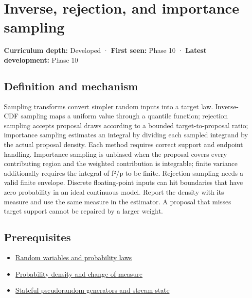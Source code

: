 \hypertarget{appendix-8d863ed954d0}{}\label{referencestart:appendix-8d863ed954d0}
\section{Inverse, rejection, and importance sampling}\label{appendix-8d863ed954d0-inverse-rejection-and-importance-sampling}

\textbf{Curriculum depth:} Developed · \textbf{First seen:} Phase 10 · \textbf{Latest development:} Phase 10

\subsection{Definition and mechanism}\label{appendix-8d863ed954d0-definition-and-mechanism}

Sampling transforms convert simpler random inputs into a target law. Inverse-CDF sampling maps a uniform value through a quantile function; rejection sampling accepts proposal draws according to a bounded target-to-proposal ratio; importance sampling estimates an integral by dividing each sampled integrand by the actual proposal density. Each method requires correct support and endpoint handling. Importance sampling is unbiased when the proposal covers every contributing region and the weighted contribution is integrable; finite variance additionally requires the integral of f²/p to be finite. Rejection sampling needs a valid finite envelope. Discrete floating-point inputs can hit boundaries that have zero probability in an ideal continuous model. Report the density with its measure and use the same measure in the estimator. A proposal that misses target support cannot be repaired by a larger weight.

\subsection{Prerequisites}\label{appendix-8d863ed954d0-prerequisites}

\begin{itemize}
\tightlist
\item
  \hyperref[appendix-4d0203f7944f]{Random variables and probability laws}
\item
  \hyperref[appendix-4815cd87ab8b]{Probability density and change of measure}
\item
  \hyperref[appendix-e0f7c7e08f3a]{Stateful pseudorandom generators and stream state}
\end{itemize}

